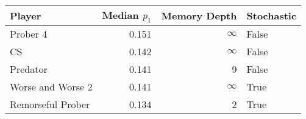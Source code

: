 \begin{tabular}{lrrl}
\toprule
            Player &  Median $p_1$ &  Memory Depth & Stochastic \\
\midrule
          Prober 4 &         0.151 &            \(\infty\) &      False \\
                CS &         0.142 &            \(\infty\) &      False \\
          Predator &         0.141 &             9 &      False \\
 Worse and Worse 2 &         0.141 &            \(\infty\) &       True \\
 Remorseful Prober &         0.134 &             2 &       True \\
\bottomrule
\end{tabular}
